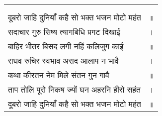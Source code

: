 {
{\bfseries
\setlength{\mylenone}{0pt}
\settowidth{\mylentwo}{}
\setlength{\mylenone}{\maxof{\mylenone}{\mylentwo}}
\settowidth{\mylentwo}{दूबरो जाहि दुनियाँ कहै सो भक्त भजन मोटो महंत}
\setlength{\mylenone}{\maxof{\mylenone}{\mylentwo}}
\settowidth{\mylentwo}{सदाचार गुरु सिष्य त्यागबिधि प्रगट दिखाई}
\setlength{\mylenone}{\maxof{\mylenone}{\mylentwo}}
\settowidth{\mylentwo}{बाहिर भीतर बिसद लगी नहिं कलिजुग काई}
\setlength{\mylenone}{\maxof{\mylenone}{\mylentwo}}
\settowidth{\mylentwo}{राघव रुचिर स्वभाव असद आलाप न भावै}
\setlength{\mylenone}{\maxof{\mylenone}{\mylentwo}}
\settowidth{\mylentwo}{कथा कीरतन नेम मिले संतन गुन गावै}
\setlength{\mylenone}{\maxof{\mylenone}{\mylentwo}}
\settowidth{\mylentwo}{ताप तोलि पूरो निकष ज्यों घन अहरनि हीरो सहंत}
\setlength{\mylenone}{\maxof{\mylenone}{\mylentwo}}
\settowidth{\mylentwo}{दूबरो जाहि दुनियाँ कहै सो भक्त भजन मोटो महंत}
\setlength{\mylenone}{\maxof{\mylenone}{\mylentwo}}
\setlength{\mylentwo}{\baselineskip}
\setlength{\mylenone}{\mylenone + 1pt}
\begin{longtable}[l]{@{\hspace*{\mylen}}>{\setlength\parfillskip{0pt}}p{\mylenone}@{}@{}l@{}}
 & \\[-\the\mylentwo]
\centering{॥ १६८ \hspace*{-1.5mm}॥} & \\ \nopagebreak
दूबरो जाहि दुनियाँ कहै सो भक्त भजन मोटो महंत & ॥\\
सदाचार गुरु सिष्य त्यागबिधि प्रगट दिखाई & ।\\ \nopagebreak
बाहिर भीतर बिसद लगी नहिं कलिजुग काई & ॥\\
राघव रुचिर स्वभाव असद आलाप न भावै & ।\\ \nopagebreak
कथा कीरतन नेम मिले संतन गुन गावै & ॥\\
ताप तोलि पूरो निकष ज्यों घन अहरनि हीरो सहंत & ।\\ \nopagebreak
दूबरो जाहि दुनियाँ कहै सो भक्त भजन मोटो महंत & ॥
\end{longtable}
}
}
